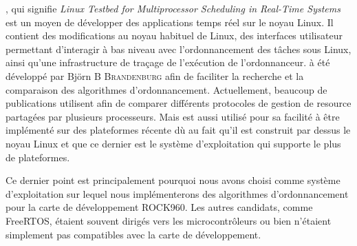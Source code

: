 \litmus, qui signifie \textit{Linux Testbed for Multiprocessor Scheduling in Real-Time Systems} est un moyen de développer des applications temps réel sur le noyau Linux. Il contient des modifications au noyau habituel de Linux, des interfaces utilisateur permettant d'interagir à bas niveau avec l'ordonnancement des tâches sous Linux, ainsi qu'une infrastructure de traçage de l'exécution de l'ordonnanceur.
\litmus à été développé par Björn \textsc{B Brandenburg} \cite{brandenburg2011scheduling} afin de faciliter la recherche et la comparaison des algorithmes d'ordonnancement. Actuellement, beaucoup de publications utilisent \litmus afin de comparer différents protocoles de gestion de resource partagées par plusieurs processeurs. Mais \litmus est aussi utilisé pour sa facilité à être implémenté sur des plateformes récente dù au fait qu'il est construit par dessus le noyau Linux et que ce dernier est le système d'exploitation qui supporte le plus de plateformes. 

Ce dernier point est principalement pourquoi nous avons choisi \litmus comme système d'exploitation sur lequel nous implémenterons des algorithmes d'ordonnancement pour la carte de développement ROCK960. Les autres candidats, comme FreeRTOS, étaient souvent dirigés vers les microcontrôleurs ou bien n'étaient simplement pas compatibles avec la carte de développement. 

